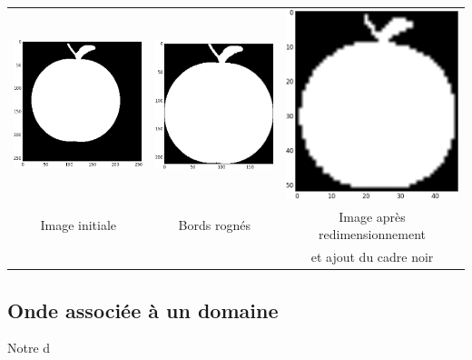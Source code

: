 \documentclass[a4paper,10pt]{article} %
\theoremstyle{definition} %
\begin{document}
\begin{center}
  \begin{tabular}{c c c}
     \includegraphics[scale=0.25]{pictures/apple.png} & \includegraphics[scale=0.25]{pictures/apple-crop.png} & \includegraphics[scale=0.25]{pictures/apple-normalize.png} \\
    Image initiale & Bords rognés & Image après redimensionnement  \\
                          &                        &  et ajout du cadre noir
      \end{tabular}
\end{center}


  \subsection{Onde associée à un domaine}

Notre d
\end{document}
